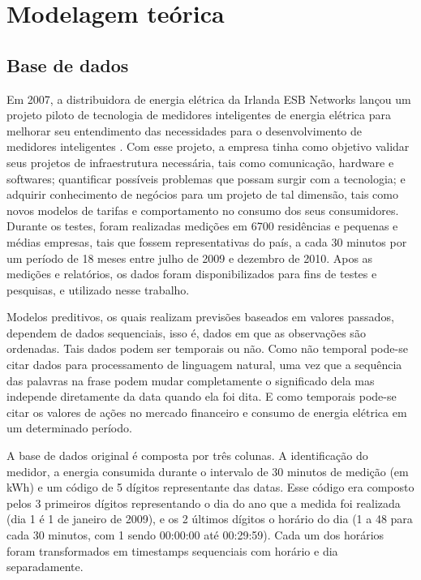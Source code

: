 \documentclass[
	12pt,				%
	oneside,			%
	a4paper,			%
	english,			%
	brazil				%
	]{abntex2}
\begin{document}
\chapter{Modelagem teórica}

\section{Base de dados}

	Em 2007, a distribuidora de energia elétrica da Irlanda ESB Networks lançou um projeto piloto de tecnologia de medidores inteligentes de energia elétrica para melhorar seu entendimento das necessidades para o desenvolvimento de medidores inteligentes \cite{CER}. Com esse projeto, a empresa tinha como objetivo validar seus projetos de infraestrutura necessária, tais como comunicação, hardware e softwares; quantificar possíveis problemas que possam surgir com a tecnologia; e adquirir conhecimento de negócios para um projeto de tal dimensão, tais como novos modelos de tarifas e comportamento no consumo dos seus consumidores. Durante os testes, foram realizadas medições em 6700 residências e pequenas e médias empresas, tais que fossem representativas do país, a cada 30 minutos por um período de 18 meses entre julho de 2009 e dezembro de 2010. Apos as medições e relatórios, os dados foram disponibilizados para fins de testes e pesquisas, e utilizado nesse trabalho.	
	
	Modelos preditivos, os quais realizam previsões baseados em valores passados, dependem de dados sequenciais, isso é, dados em que as observações são ordenadas. Tais dados podem ser temporais ou não. Como não temporal pode-se citar dados para processamento de linguagem natural, uma vez que a sequência das palavras na frase podem mudar completamente o significado dela mas independe diretamente da data quando ela foi dita. E como temporais pode-se citar os valores de ações no mercado financeiro e consumo de energia elétrica em um determinado período.
	
	A base de dados original é composta por três colunas. A identificação do medidor, a energia consumida durante o intervalo de 30 minutos de medição (em kWh) e um código de 5 dígitos representante das datas. Esse código era composto pelos 3 primeiros dígitos representando o dia do ano que a medida foi realizada (dia 1 é 1 de janeiro de 2009), e os 2 últimos dígitos o horário do dia (1 a 48 para cada 30 minutos, com 1 sendo 00:00:00 até 00:29:59). Cada um dos horários foram transformados em timestamps sequenciais com horário e dia separadamente. 
	
\end{document}
